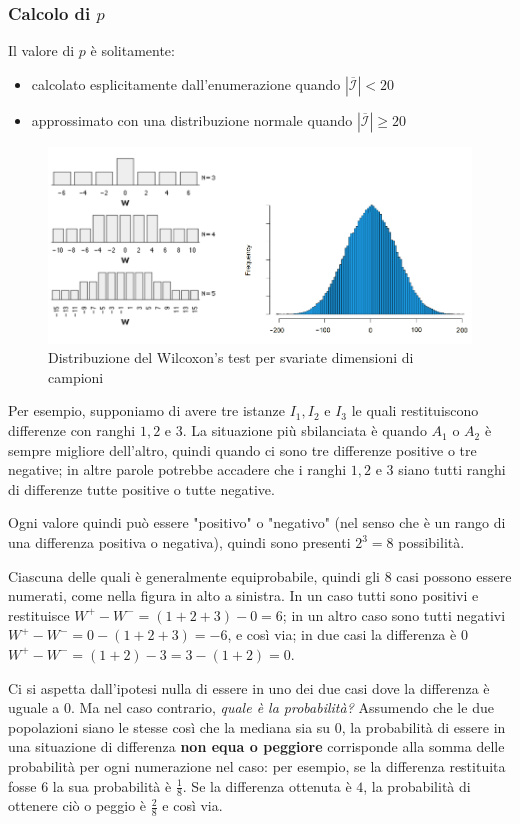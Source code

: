 \documentclass{article}
\newcommand{\ovcal}[1]{\overline{\mathcal{#1}}}
\begin{document}
\subsubsection{Calcolo di $p$}
Il valore di $p$ è solitamente:
\begin{itemize}
    \item calcolato esplicitamente dall'enumerazione quando $|\ovcal{I}|<20$
    \item approssimato con una distribuzione normale quando $|\ovcal{I}|\geq 20$
\end{itemize}
\begin{figure}[H]
    \centering
    \includegraphics[scale=0.5]{images/p_val.png}
    \caption{Distribuzione del Wilcoxon's test per svariate dimensioni di campioni}
\end{figure}
Per esempio, supponiamo di avere tre istanze $I_1, I_2$ e $I_3$ le quali restituiscono
differenze con ranghi $1,2$ e $3$. La situazione più sbilanciata è quando $A_1$ o $A_2$
è sempre migliore dell'altro, quindi quando ci sono tre differenze positive o tre negative;
in altre parole potrebbe accadere che i ranghi $1,2$ e $3$ siano tutti ranghi di
differenze tutte positive o tutte negative.

Ogni valore quindi può essere "positivo" o "negativo" (nel senso che è un rango
di una differenza positiva o negativa), quindi sono presenti $2^3=8$ possibilità.

Ciascuna delle quali è generalmente equiprobabile, quindi gli $8$ casi possono essere
numerati, come nella figura in alto a sinistra. In un caso tutti sono positivi e restituisce
$W^+-W^-=(1+2+3)-0=6$; in un altro caso sono tutti negativi $W^+-W^-=0-(1+2+3)=-6$, e così via;
in due casi la differenza è $0$$W^+-W^-=(1+2)-3=3-(1+2)=0$.

    Ci si aspetta dall'ipotesi nulla di essere in uno dei due casi dove la differenza è uguale a $0$.
    Ma nel caso contrario, \textit{quale è la probabilità?} Assumendo che le due popolazioni
    siano le stesse così che la mediana sia su $0$, la probabilità di essere in una situazione
    di differenza \textbf{non equa o peggiore} corrisponde alla somma delle probabilità per
    ogni numerazione nel caso: per esempio, se la differenza restituita fosse $6$ la sua
    probabilità è $\frac{1}{8}$. Se la differenza ottenuta è $4$, la probabilità di ottenere
    ciò o peggio è $\frac{2}{8}$ e così via.
\end{document}
